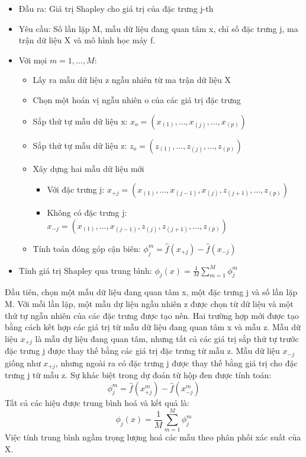 \begin{itemize} 
\item Đầu ra: Giá trị Shapley cho giá trị của đặc trưng j-th 
\item Yêu cầu: Số lần lặp M, mẫu dữ liệu đang quan tâm x, chỉ số đặc trưng j, ma trận dữ liệu X và mô hình học máy f.
\item Với mọi $m = 1, \dots, M$:
\begin{itemize}
\item Lấy ra mẫu dữ liệu z ngẫu nhiên từ ma trận dữ liệu X
\item Chọn một hoán vị ngẫu nhiên o của các giá trị đặc trưng
\item Sắp thứ tự mẫu dữ liệu x: $x_o=(x_{(1)},\ldots,x_{(j)},\ldots,x_{(p)})$
\item Sắp thứ tự mẫu dữ liệu z: $z_o=(z_{(1)},\ldots,z_{(j)},\ldots,z_{(p)})$ 
\item Xây dựng hai mẫu dữ liệu mới
\begin{itemize}
\item Với đặc trưng j: $ x_{+j}=(x_{(1)},\ldots,x_{(j-1)},x_{(j)},z_{(j+1)},\ldots,z_{(p)}) $
\item Không có đặc trưng j: $ x_{-j}=(x_{(1)},\ldots,x_{(j-1)},z_{(j)},z_{(j+1)},\ldots,z_{(p)})$
\end{itemize}
\item Tính toán đóng góp cận biên: $ \phi_j^{m}=\hat{f}(x_{+j})-\hat{f}(x_{-j})$
\end{itemize}
\item Tính giá trị Shapley qua trung bình: $\phi_j(x)=\frac{1}{M}\sum_{m=1}^M\phi_j^{m}$
\end{itemize}

Đầu tiên, chọn một mẫu dữ liệu đang quan tâm x, một đặc trưng j và số lần lặp M. Với mỗi lần lặp, một mẫu dự liệu ngẫu nhiên z được chọn từ dữ liệu và một thứ tự ngẫu nhiên của các đặc trưng được tạo nên. Hai trường hợp mới được tạo bằng cách kết hợp các giá trị từ mẫu dữ liệu đang quan tâm x và mẫu z. Mẫu dữ liệu $x_{+j}$ là mẫu dự liệu đang quan tâm, nhưng tất cả các giá trị sắp thứ tự trước đặc trưng j được thay thế bằng các giá trị đặc trưng từ mẫu z. Mẫu dữ liệu $x_{-j}$ giống như $x_{+j}$, nhưng ngoài ra có đặc trưng j được thay thế bằng giá trị cho đặc trưng j từ mẫu z. Sự khác biệt trong dự đoán từ hộp đen được tính toán:
$$\phi_j^{m}=\hat{f}(x^m_{+j})-\hat{f}(x^m_{-j})$$
Tất cả các hiệu được trung bình hoá và kết quả là:
$$\phi_j(x)=\frac{1}{M}\sum_{m=1}^M\phi_j^{m} $$
Việc tính trung bình ngầm trọng lượng hoá các mẫu theo phân phối xác suất của X.

